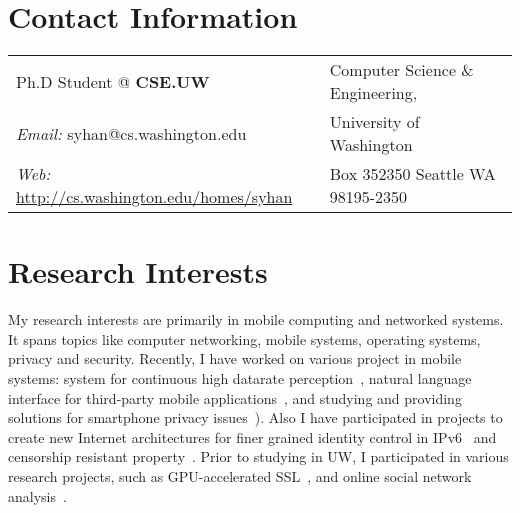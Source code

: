 \documentclass[margin,line]{res}
\begin{document}

\begin{resume}

\section{\sc Contact Information}
\vspace{.05in}

\begin{tabular}{@{}p{3in}p{3in}}
Ph.D Student @ \textbf{CSE.UW}                & Computer Science \& Engineering,\\
{\it Email:} syhan@cs.washington.edu		  &University of Washington    \\
{\it Web:} \url{http://cs.washington.edu/homes/syhan}	  & Box 352350 Seattle WA 98195-2350   \\
\end{tabular}

\section{\sc Research Interests}
My research interests are primarily in mobile computing and networked systems. 
It spans topics like computer networking, mobile systems, operating systems, privacy and security. 
Recently, I have worked on various project in mobile systems: 
system for continuous high datarate perception~\cite{hotos13}, 
natural language interface for third-party mobile applications~\cite{ubicomp13, hotmobile13}, 
and studying and providing solutions for smartphone privacy
issues~\cite{spsm12,nsdi12,ccs2011}).  
Also I have participated in projects to create new Internet architectures for
finer grained identity control in IPv6~\cite{sigcomm13} and censorship
resistant property~\cite{hotnets11}.  Prior to studying in UW, I participated
in various research projects, such as GPU-accelerated SSL~\cite{nsdi11}, 
and online social network analysis~\cite{www07}.



\end{resume}
\end{document}
